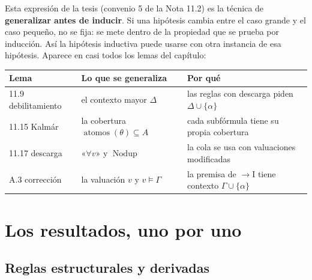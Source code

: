 \documentclass[11pt,a4paper]{article}
\newcommand{\Imp}{\rightarrow}
\newcommand{\atomos}{\operatorname{atomos}}
\newcommand{\Nodup}{\operatorname{Nodup}}
\begin{document}
Esta expresión de la tesis (convenio 5 de la Nota 11.2) es la técnica de
\textbf{generalizar antes de inducir}. Si una hipótesis cambia entre el caso
grande y el caso pequeño, no se fija: se mete dentro de la propiedad que se
prueba por inducción. Así la hipótesis inductiva puede usarse con otra
instancia de esa hipótesis. Aparece en casi todos los lemas del capítulo:
\begin{center}
{\small
\begin{tabular}{@{}lll@{}}
\toprule
\textbf{Lema} & \textbf{Lo que se generaliza} & \textbf{Por qué}\\
\midrule
11.9 debilitamiento & el contexto mayor \(\Delta\) & las reglas con descarga piden \(\Delta\cup\{\alpha\}\)\\
11.15 Kalmár & la cobertura \(\atomos(\theta)\subseteq A\) & cada subfórmula tiene su propia cobertura\\
11.17 descarga & «\(\forall v\)» y \(\Nodup\) & la cola se usa con valuaciones modificadas\\
A.3 corrección & la valuación \(v\) y \(v\models\Gamma\) & la premisa de \(\Imp\)I tiene contexto \(\Gamma\cup\{\alpha\}\)\\
\bottomrule
\end{tabular}}
\end{center}

\section{Los resultados, uno por uno}

\subsection{Reglas estructurales y derivadas}
\end{document}
